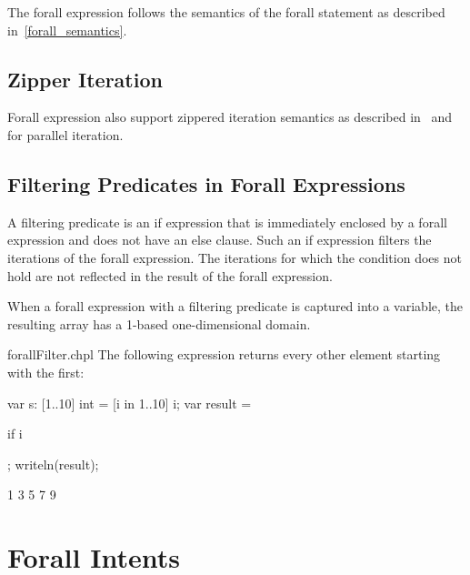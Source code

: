 The forall expression follows the semantics of the forall statement as
described in~\ref{forall_semantics}.

\subsection{Zipper Iteration}
Forall expression also support zippered iteration semantics as
described in~ and~ for
parallel iteration.

\subsection{Filtering Predicates in Forall Expressions}
\label{Filtering_Predicates_Forall}

A filtering predicate is an if expression that is immediately enclosed
by a forall expression and does not have an
else clause.  Such an if expression filters the iterations of the
forall expression.  The iterations for which the condition does not
hold are not reflected in the result of the forall expression.

When a forall expression with a filtering predicate is captured into
a variable, the resulting array has a 1-based one-dimensional domain.

\begin{chapelexample}{forallFilter.chpl}
The following expression returns every other element starting with the
first:
\begin{chapelpre}
var s: [1..10] int = [i in 1..10] i;
var result =
\end{chapelpre}
\begin{chapel}
[i in 1..s.numElements] if i %
\end{chapel}
\begin{chapelpost}
;
writeln(result);
\end{chapelpost}
\begin{chapeloutput}
1 3 5 7 9
\end{chapeloutput}
\end{chapelexample}


\section{Forall Intents}
\label{Forall_Intents}

